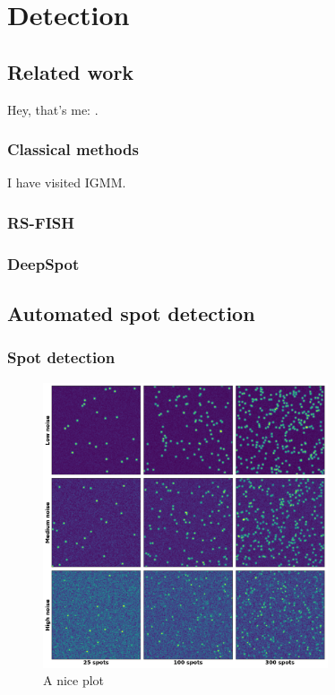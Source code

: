 
\graphicspath{{./figures/chapter2/}}


\chapter{Detection} \label{chap:chapter2}
\minitoc
\newpage


\section{Related work}


Hey, that's me: \cite{imbert_fishquant_2022}.

\subsection{Classical methods}

I have visited \ac{IGMM}.

\subsection{RS-FISH}

\subsection{DeepSpot}


\section{Automated spot detection}


\subsection{Spot detection}


\begin{figure}[h]
    \centering
    \includegraphics[width=0.75\textwidth]{figures/chapter2/spots_mosaic}
    \caption{A nice plot}
    \label{fig:testA}
\end{figure}


